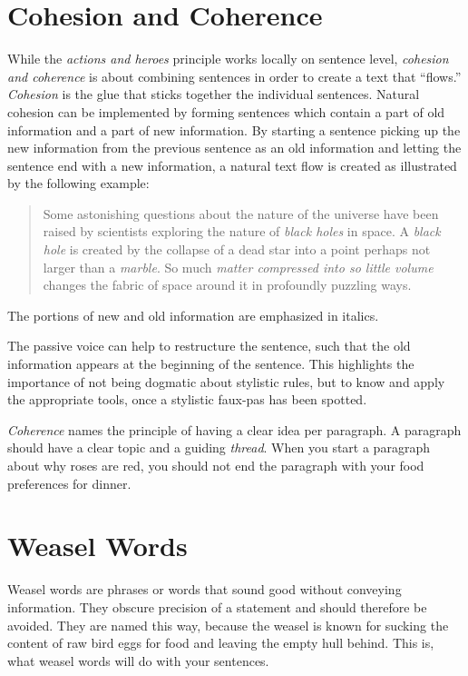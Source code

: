 \section{Cohesion and Coherence} %
While the \emph{actions and heroes} principle works locally on sentence level, \emph{cohesion and coherence} is about combining sentences in order to create a text that ``flows.''
\emph{Cohesion} is the glue that sticks together the individual sentences. 
Natural cohesion can be implemented by forming sentences which contain a part of old information and a part of new information. 
By starting a sentence picking up the new information from the previous sentence as an old information and letting the sentence end with a new information, a natural text flow is created as illustrated by the following example:
\begin{quote}
\small
Some astonishing questions about the nature of the universe have been raised by scientists exploring the nature of \emph{black holes} in space.  A \emph{black hole} is created by the collapse of a dead star into a point perhaps not larger than a \emph{marble}. So much \emph{matter compressed into so little volume} changes the fabric of space around it in profoundly puzzling ways.	
\end{quote} 
The portions of new and old information are emphasized in italics.

The passive voice can help to restructure the sentence, such that the old information appears at the beginning of the sentence.
This highlights the importance of not being dogmatic about stylistic rules, but to know and apply the appropriate tools, once a stylistic faux-pas has been spotted.

\emph{Coherence} names the principle of having a clear idea per paragraph. A paragraph should have a clear topic and a guiding \emph{thread}. When you start a paragraph about why roses are red, you should not end the paragraph with your food preferences for dinner.  
\section{Weasel Words}%
Weasel words are phrases or words that sound good without conveying information.
They obscure precision of a statement and should therefore be avoided.
They are named this way, because the weasel is known for sucking the content of raw bird eggs for food and leaving the empty hull behind.
This is, what weasel words will do with your sentences.

